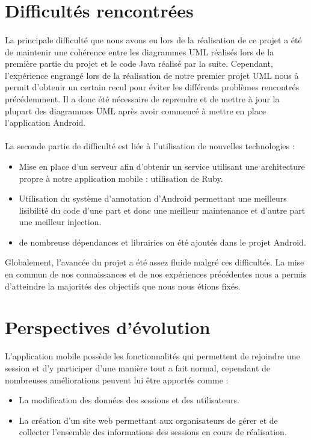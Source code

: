 \documentclass[titlepage, 12pt]{report}
\begin{document}
\section{Difficultés rencontrées}

\paragraph{}La principale difficulté que nous avons eu lors de la réalisation de ce projet a été de maintenir une cohérence entre les diagrammes UML réalisés lors de la première partie du projet et le code Java réalisé par la suite. Cependant, l'expérience engrangé lors de la réalisation de notre premier projet UML nous à permit d'obtenir un certain recul pour éviter les différents problèmes rencontrés précédemment.
Il a donc été nécessaire de reprendre et de mettre à jour la plupart des diagrammes UML après avoir commencé à mettre en place l'application Android.

\paragraph{}La seconde partie de difficulté est liée à l'utilisation de nouvelles technologies :
\begin{itemize}
	\item Mise en place d'un serveur afin d'obtenir un service utilisant une architecture propre à notre application mobile : utilisation de Ruby.
	\item Utilisation du système d'annotation d'Android permettant une meilleurs lisibilité du code d'une part et donc une meilleur maintenance et d'autre part une meilleur injection.
	\item de nombreuse dépendances et librairies on été ajoutés dans le projet Android. 
\end{itemize}

Globalement, l'avancée du projet a été assez fluide malgré ces difficultés. La mise en commun de nos connaissances et de nos expériences précédentes nous a permis d'atteindre la majorités des objectifs que nous nous étions fixés.

\section{Perspectives d'évolution}

L'application mobile possède les fonctionnalités qui permettent de rejoindre une session et d'y participer d'une manière tout a fait normal, cependant de nombreuses améliorations peuvent lui être apportés comme :
\begin{itemize}
	\item La modification des données des sessions et des utilisateurs.
	\item La création d'un site web permettant aux organisateurs de gérer et de collecter l'ensemble des informations des sessions en cours de réalisation.
\end{itemize}
\end{document}
